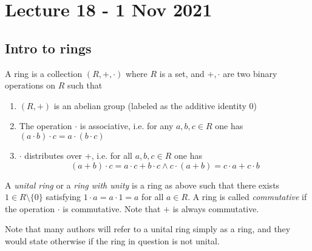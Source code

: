 \section{Lecture 18 - 1 Nov 2021}
\subsection{Intro to rings}
\begin{definition}
  A ring is a collection $(R,+,\cdot)$ where $R$ is a set, and $+,\cdot$ are two binary
  operations on $R$ such that 
  \begin{enumerate}
    \item $(R,+)$ is an abelian group (labeled as the additive identity $0$)
    \item The operation $\cdot$ is associative, i.e. for any $a,b,c\in R$ one has
      $(a\cdot b)\cdot c = a\cdot (b\cdot c)$
    \item $\cdot$ distributes over $+$, i.e. for all $a,b,c\in R$ one has 
      \[(a+b)\cdot c = a\cdot c+b\cdot c \land c\cdot (a+b)=c\cdot a + c\cdot b\]
  \end{enumerate}
  A \emph{unital ring} or a \emph{ring with unity} is a ring as above such that there
  exists $1\in R\setminus \{0\}$ satisfying $1\cdot a = a\cdot 1 = a$ for all $a\in R$.
  A ring is called \emph{commutative} if the operation $\cdot$ is commutative. Note that
  $+$ is always commutative.
  \label{def:ring}
\end{definition}
\begin{remark}
  Note that many authors will refer to a unital ring simply as a ring, and they would
  state otherwise if the ring in question is not unital.
\end{remark}

